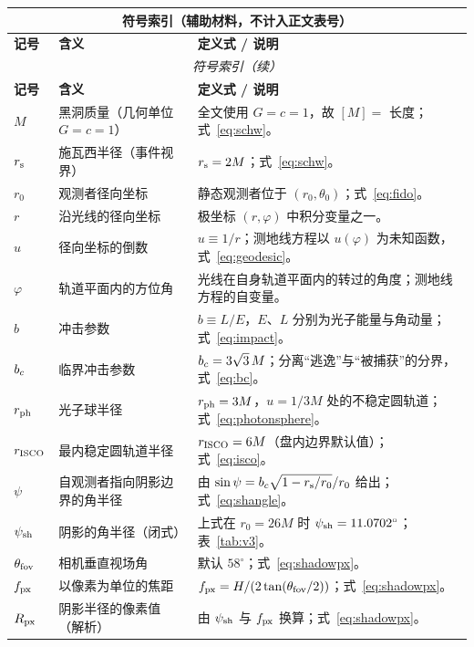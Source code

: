 \begingroup
\setlength{\LTpre}{4pt}
\setlength{\LTpost}{4pt}
\small
{}
\begin{longtable}{@{}p{2.15cm}p{5.05cm}p{7.05cm}@{}}
\multicolumn{3}{c}{\textbf{符号索引（辅助材料，不计入正文表号）}}\\[3pt]
\toprule
\textbf{记号} & \textbf{含义} & \textbf{定义式 / 说明}\\
\midrule
\endfirsthead
\multicolumn{3}{c}{\small\itshape 符号索引（续）}\\[3pt]
\toprule
\textbf{记号} & \textbf{含义} & \textbf{定义式 / 说明}\\
\midrule
\endhead
\bottomrule
\endlastfoot
$M$ & 黑洞质量（几何单位 $G=c=1$） & 全文使用 $G=c=1$，故 $[M]=$ 长度；式~\eqref{eq:schw}。\\
$r_{\mathrm s}$ & 施瓦西半径（事件视界） & $r_{\mathrm s} = 2M$；式~\eqref{eq:schw}。\\
$r_0$ & 观测者径向坐标 & 静态观测者位于 $(r_0,\theta_0)$；式~\eqref{eq:fido}。\\
$r$ & 沿光线的径向坐标 & 极坐标 $(r,\varphi)$ 中积分变量之一。\\
$u$ & 径向坐标的倒数 & $u \equiv 1/r$；测地线方程以 $u(\varphi)$ 为未知函数，式~\eqref{eq:geodesic}。\\
$\varphi$ & 轨道平面内的方位角 & 光线在自身轨道平面内的转过的角度；测地线方程的自变量。\\
$b$ & 冲击参数 & $b \equiv L/E$，$E$、$L$ 分别为光子能量与角动量；式~\eqref{eq:impact}。\\
$b_{c}$ & 临界冲击参数 & $b_{c} = 3\sqrt3\,M$；分离“逃逸”与“被捕获”的分界，式~\eqref{eq:bc}。\\
$r_{\mathrm{ph}}$ & 光子球半径 & $r_{\mathrm{ph}} = 3M$，$u=1/3M$ 处的不稳定圆轨道；式~\eqref{eq:photonsphere}。\\
$r_{\mathrm{ISCO}}$ & 最内稳定圆轨道半径 & $r_{\mathrm{ISCO}} = 6M$（盘内边界默认值）；式~\eqref{eq:isco}。\\
$\psi$ & 自观测者指向阴影边界的角半径 & 由 $\sin\psi = b_{c}\sqrt{1-r_{\mathrm s}/r_0}/r_0$ 给出；式~\eqref{eq:shangle}。\\
$\psi_{\rm sh}$ & 阴影的角半径（闭式） & 上式在 $r_0=26M$ 时 $\psi_{\rm sh}=11.0702^\circ$；表~\ref{tab:v3}。\\
$\theta_{\rm fov}$ & 相机垂直视场角 & 默认 $58^\circ$；式~\eqref{eq:shadowpx}。\\
$f_{\rm px}$ & 以像素为单位的焦距 & $f_{\rm px} = H/(2\tan(\theta_{\rm fov}/2))$；式~\eqref{eq:shadowpx}。\\
$R_{\rm px}$ & 阴影半径的像素值（解析） & 由 $\psi_{\rm sh}$ 与 $f_{\rm px}$ 换算；式~\eqref{eq:shadowpx}。\\

\end{longtable}
